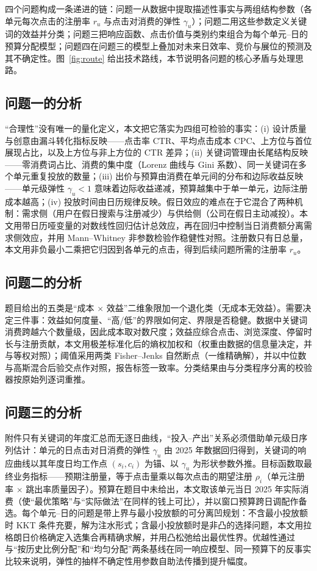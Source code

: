 四个问题构成一条递进的链：问题一从数据中提取描述性事实与两组结构参数（各单元每次点击的注册率 $r_u$ 与点击对消费的弹性 $\gamma_u$）；问题二用这些参数定义关键词的效益并分类；问题三把响应函数、点击价值与类别约束组合为每个单元--日的预算分配模型；问题四在问题三的模型上叠加对未来日效率、竞价与展位的预测及其不确定性。图~\ref{fig:route} 给出技术路线，本节说明各问题的核心矛盾与处理思路。

\subsection{问题一的分析}
“合理性”没有唯一的量化定义，本文把它落实为四组可检验的事实：(i) 设计质量与创意由漏斗转化指标反映——点击率 CTR、平均点击成本 CPC、上方位与首位展现占比，以及上方位与非上方位的 CTR 差异；(ii) 关键词管理由长尾结构反映——零消费词占比、消费的集中度（Lorenz 曲线与 Gini 系数）、同一关键词在多个单元重复投放的数量；(iii) 出价与预算由消费在单元间的分布和边际收益反映——单元级弹性 $\gamma_u<1$ 意味着边际收益递减，预算越集中于单一单元，边际注册成本越高；(iv) 投放时间由日历规律反映。假日效应的难点在于它混合了两种机制：需求侧（用户在假日搜索与注册减少）与供给侧（公司在假日主动减投）。本文用带日历哑变量的对数线性回归估计总效应，再在回归中控制当日消费额分离需求侧效应，并用 Mann--Whitney 非参数检验作稳健性对照。注册数只有日总量，本文用非负最小二乘把它归因到各单元的点击，得到后续问题所需的注册率 $r_u$。

\subsection{问题二的分析}
题目给出的五类是“成本 $\times$ 效益”二维象限加一个退化类（无成本无效益）。需要决定三件事：效益如何度量、“高/低”的界限如何定、界限是否稳健。数据中关键词消费跨越六个数量级，因此成本取对数尺度；效益应综合点击、浏览深度、停留时长与注册贡献，本文用极差标准化后的熵权加权和（权重由数据的信息量决定，并与等权对照）；阈值采用两类 Fisher--Jenks 自然断点（一维精确解），并以中位数与高斯混合后验交点作对照，报告标签一致率。分类结果由与分类程序分离的校验器按原始列逐词重推。

\subsection{问题三的分析}
附件只有关键词的年度汇总而无逐日曲线，“投入--产出”关系必须借助单元级日序列估计：单元的日点击对日消费的弹性 $\gamma_u$ 由 2025 年数据回归得到，关键词的响应曲线以其年度日均工作点 $(s_i,c_i)$ 为锚、以 $\gamma_u$ 为形状参数外推。目标函数取最终业务指标——预期注册量，等于点击量乘以每次点击的期望注册 $\rho_i$（单元注册率 $\times$ 跳出率质量因子）。预算在题目中未给出，本文取该单元当日 2025 年实际消费（使“最优策略”与“实际做法”在同样的钱上可比），并以窗口预算跨日调配作备选。每个单元--日的问题是带上界与最小投放额的可分离凹规划：不含最小投放额时 KKT 条件充要，解为注水形式；含最小投放额时是非凸的选择问题，本文用拉格朗日价格确定入选集合再精确求解，并用凸松弛给出最优性界。优越性通过与“按历史比例分配”和“均匀分配”两条基线在同一响应模型、同一预算下的反事实比较来说明，弹性的抽样不确定性用参数自助法传播到提升幅度。

